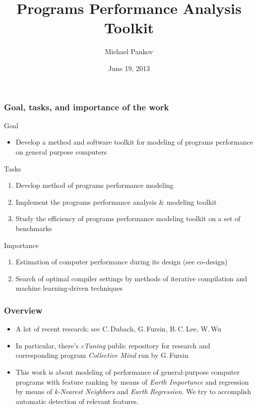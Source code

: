 \documentclass{beamer}
\title{Programs Performance Analysis Toolkit}
\author{Michael Pankov}
\institute{Bauman Moscow State Technical University}
\date{June 19, 2013}
\begin{document}
\maketitle

\begin{frame}
\frametitle{Goal, tasks, and importance of the work}

\begin{block}{Goal}
	\begin{itemize}
		\item Develop a method and software toolkit for modeling of programs performance on general purpose computers
	\end{itemize}
\end{block}

\begin{block}{Tasks}
	\begin{enumerate}
		\item Develop method of programs performance modeling 
		\item Implement the programs performance analysis \& modeling toolkit
		\item Study the efficiency of programs performance modeling toolkit on a set of benchmarks
	\end{enumerate}
\end{block}

\begin{block}{Importance}
	\begin{enumerate}
		\item Estimation of computer performance during its design (see co-design)
		\item Search of optimal compiler settings by methods of iterative compilation and machine learning-driven techniques
	\end{enumerate}
\end{block}

\end{frame}

\begin{frame}
\frametitle{Overview}
	
	\begin{itemize}
		\item A lot of recent research: see C.\,Dubach, G.\,Fursin, B.\,C.\,Lee, W.\,Wu
		\item In particular, there's \textit{cTuning} public repository for research and corresponding program \textit{Collective Mind} run by G.\,Fursin
		\item This work is about modeling of performance of general-purpose computer programs with feature ranking by means of \textit{Earth Importance} and regression by means of \textit{k-Nearest Neighbors} and \textit{Earth Regression}. We try to accomplish automatic detection of relevant features.
	\end{itemize}
\end{frame}
\end{document}
